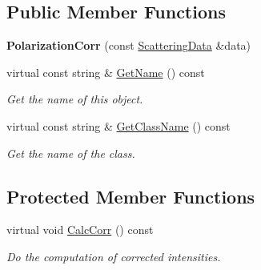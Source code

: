 \subsection*{Public Member Functions}
\begin{DoxyCompactItemize}
\item 
\mbox{\label{class_obj_cryst_1_1_polarization_corr_a2a4847d1595188d8023f20c9c9d0d4ce}} 
{\bfseries Polarization\+Corr} (const \mbox{\hyperlink{class_obj_cryst_1_1_scattering_data}{Scattering\+Data}} \&data)
\item 
\mbox{\label{class_obj_cryst_1_1_polarization_corr_a6309db80b4fb78624ea85a2553704dd1}} 
virtual const string \& \mbox{\hyperlink{class_obj_cryst_1_1_polarization_corr_a6309db80b4fb78624ea85a2553704dd1}{Get\+Name}} () const
\begin{DoxyCompactList}\small\item\em Get the name of this object. \end{DoxyCompactList}\item 
\mbox{\label{class_obj_cryst_1_1_polarization_corr_a7d359223fd039950e38d1ff72917e58d}} 
virtual const string \& \mbox{\hyperlink{class_obj_cryst_1_1_polarization_corr_a7d359223fd039950e38d1ff72917e58d}{Get\+Class\+Name}} () const
\begin{DoxyCompactList}\small\item\em Get the name of the class. \end{DoxyCompactList}\end{DoxyCompactItemize}
\subsection*{Protected Member Functions}
\begin{DoxyCompactItemize}
\item 
\mbox{\label{class_obj_cryst_1_1_polarization_corr_aa01f34ebe827424603bde00d7773f43e}} 
virtual void \mbox{\hyperlink{class_obj_cryst_1_1_polarization_corr_aa01f34ebe827424603bde00d7773f43e}{Calc\+Corr}} () const
\begin{DoxyCompactList}\small\item\em Do the computation of corrected intensities. \end{DoxyCompactList}\end{DoxyCompactItemize}
